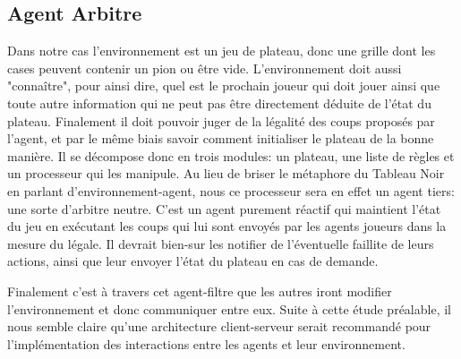 \subsection{ Agent \og Arbitre \fg{} }

Dans notre cas l'environnement est un jeu de plateau, donc une grille dont les cases peuvent contenir un pion ou être vide. L'environnement doit aussi "connaître", pour ainsi dire, quel est le prochain joueur qui doit jouer ainsi que toute autre information qui ne peut pas être directement déduite de l'état du plateau. Finalement il doit pouvoir juger de la légalité des coups proposés par l'agent, et par le même biais savoir comment initialiser le plateau de la bonne manière.
Il se décompose donc en trois modules: un plateau, une liste de règles et un processeur qui les manipule. Au lieu de briser le métaphore du \og Tableau Noir \fg{} en parlant d'environnement-agent, nous ce processeur sera en effet un agent tiers: une sorte d'arbitre neutre. C'est un agent purement réactif qui maintient l'état du jeu en exécutant les coups qui lui sont envoyés par les agents joueurs dans la mesure du légale. Il devrait bien-sur les notifier de l'éventuelle faillite de leurs actions, ainsi que leur envoyer l'état du plateau en cas de demande. 


Finalement c'est à travers cet agent-filtre que les autres iront modifier l'environnement et donc communiquer entre eux. Suite à cette étude préalable, il nous semble claire qu'une architecture client-serveur serait recommandé pour l'implémentation des interactions entre les agents et leur environnement.